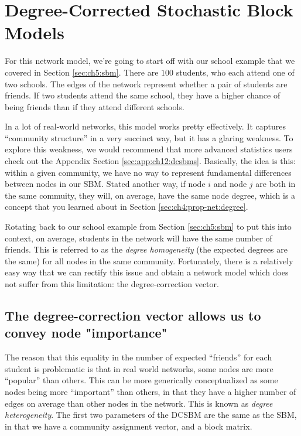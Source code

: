 \section{Degree-Corrected Stochastic Block Models}
\label{sec:ch5:dcsbm}


For this network model, we're going to start off with our school example that we covered in Section \ref{sec:ch5:sbm}. There are $100$ students, who each attend one of two schools. The edges of the network represent whether a pair of students are friends. If two students attend the same school, they have a higher chance of being friends than if they attend different schools. 

In a lot of real-world networks, this model works pretty effectively. It captures ``community structure'' in a very succinct way, but it has a glaring weakness. To explore this weakness, we would recommend that more advanced statistics users check out the Appendix Section \ref{sec:app:ch12:dcsbms}. Basically, the idea is this: within a given community, we have {no way} to represent fundamental differences between nodes in our SBM. Stated another way, if node $i$ and node $j$ are both in the same commuity, they will, on average, have the same {node degree}, which is a concept that you learned about in Section \ref{sec:ch4:prop-net:degree}. 

Rotating back to our school example from Section \ref{sec:ch5:sbm} to put this into context, on average, students in the network will have the same number of friends. This is referred to as the \textit{degree homogeneity} (the expected degrees are the same) for all nodes in the same community. Fortunately, there is a relatively easy way that we can rectify this issue and obtain a network model which does not suffer from this limitation: the degree-correction vector.

\subsection{The degree-correction vector allows us to convey node "importance"}

The reason that this equality in the number of expected ``friends'' for each student is problematic is that in real world networks, some nodes are more ``popular'' than others. This can be more generically conceptualized as some nodes being more ``important'' than others, in that they have a higher number of edges on average than other nodes in the network. This is known as \textit{degree heterogeneity}. The first two parameters of the DCSBM are the same as the SBM, in that we have a community assignment vector, and a block matrix.

